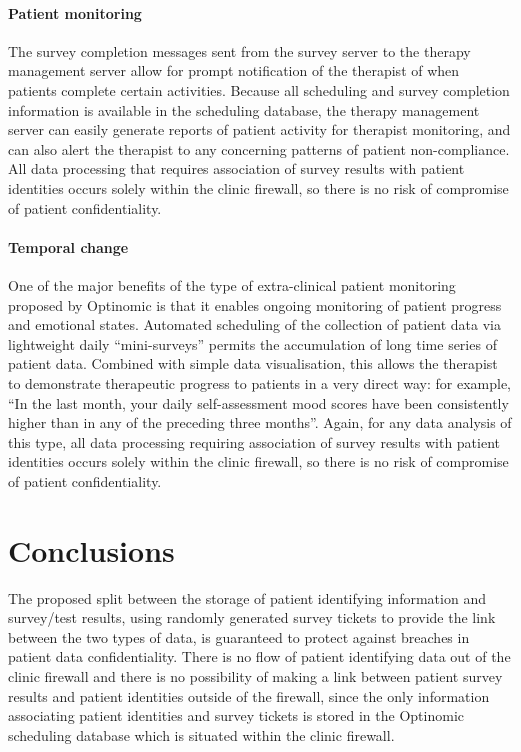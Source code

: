 \documentclass[DIV=calc,paper=a4,fontsize=11pt,twocolumn]{scrartcl}
\begin{document}
\paragraph{Patient monitoring}

The survey completion messages sent from the survey server to the
therapy management server allow for prompt notification of the
therapist of when patients complete certain activities.  Because all
scheduling and survey completion information is available in the
scheduling database, the therapy management server can easily generate
reports of patient activity for therapist monitoring, and can also
alert the therapist to any concerning patterns of patient
non-compliance.  All data processing that requires association of
survey results with patient identities occurs solely within the clinic
firewall, so there is no risk of compromise of patient
confidentiality.

\paragraph{Temporal change}

One of the major benefits of the type of extra-clinical patient
monitoring proposed by Optinomic is that it enables ongoing monitoring
of patient progress and emotional states.  Automated scheduling of the
collection of patient data via lightweight daily ``mini-surveys''
permits the accumulation of long time series of patient data.
Combined with simple data visualisation, this allows the therapist to
demonstrate therapeutic progress to patients in a very direct way: for
example, ``In the last month, your daily self-assessment mood scores
have been consistently higher than in any of the preceding three
months''.  Again, for any data analysis of this type, all data
processing requiring association of survey results with patient
identities occurs solely within the clinic firewall, so there is no
risk of compromise of patient confidentiality.


\section*{Conclusions}

The proposed split between the storage of patient identifying
information and survey/test results, using randomly generated survey
tickets to provide the link between the two types of data, is
guaranteed to protect against breaches in patient data
confidentiality.  There is no flow of patient identifying data out of
the clinic firewall and there is no possibility of making a link
between patient survey results and patient identities outside of the
firewall, since the only information associating patient identities
and survey tickets is stored in the Optinomic scheduling database
which is situated within the clinic firewall.
\end{document}
